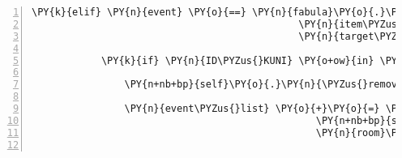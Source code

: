 \begin{Verbatim}[commandchars=\\\{\},numbers=left,firstnumber=1,stepnumber=1]
        \PY{k}{elif} \PY{n}{event} \PY{o}{==} \PY{n}{fabula}\PY{o}{.}\PY{n}{TriesToDropEvent}\PY{p}{(}\PY{n}{identifier}\PY{o}{=}\PY{n}{ID\PYZus{}CASSANDRA}\PY{p}{,}
                                              \PY{n}{item\PYZus{}identifier}\PY{o}{=}\PY{l+s}{\PYZsq{}}\PY{l+s}{cake}\PY{l+s}{\PYZsq{}}\PY{p}{,}
                                              \PY{n}{target\PYZus{}identifier}\PY{o}{=}\PY{l+s}{\PYZsq{}}\PY{l+s}{guardian}\PY{l+s}{\PYZsq{}}\PY{p}{)}\PY{p}{:}

            \PY{k}{if} \PY{n}{ID\PYZus{}KUNI} \PY{o+ow}{in} \PY{n}{room}\PY{o}{.}\PY{n}{entity\PYZus{}locations}\PY{o}{.}\PY{n}{keys}\PY{p}{(}\PY{p}{)}\PY{p}{:}

                \PY{n+nb+bp}{self}\PY{o}{.}\PY{n}{\PYZus{}remove\PYZus{}sentence}\PY{p}{(}\PY{n}{ID\PYZus{}CASSANDRA}\PY{p}{,} \PY{l+s}{\PYZsq{}}\PY{l+s}{Willst du ein Stück Kuchen?}\PY{l+s}{\PYZsq{}}\PY{p}{)}

                \PY{n}{event\PYZus{}list} \PY{o}{+}\PY{o}{=} \PY{p}{[}\PY{n}{fabula}\PY{o}{.}\PY{n}{DropsEvent}\PY{p}{(}\PY{n}{ID\PYZus{}CASSANDRA}\PY{p}{,}
                                                 \PY{n+nb+bp}{self}\PY{o}{.}\PY{n}{host}\PY{o}{.}\PY{n}{rack}\PY{o}{.}\PY{n}{entity\PYZus{}dict}\PY{p}{[}\PY{l+s}{\PYZsq{}}\PY{l+s}{cake}\PY{l+s}{\PYZsq{}}\PY{p}{]}\PY{p}{,}
                                                 \PY{n}{room}\PY{o}{.}\PY{n}{entity\PYZus{}locations}\PY{p}{[}\PY{l+s}{\PYZsq{}}\PY{l+s}{guardian}\PY{l+s}{\PYZsq{}}\PY{p}{]}\PY{p}{)}\PY{p}{]}


\end{Verbatim}
